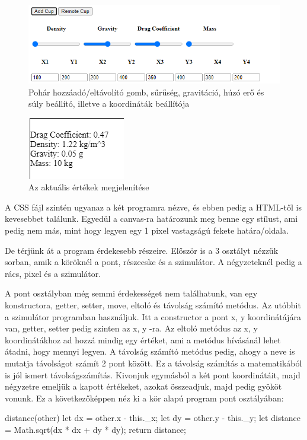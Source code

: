 \begin{figure}[h]
	\centering
	\includegraphics[width=\textwidth]{images/html.png}
	\caption{Pohár hozzáadó/eltávolító gomb, sűrűség, gravitáció, húzó erő és súly beállító, illetve a koordináták beállítója}
	\label{fig:html}
\end{figure}

\begin{figure}[h]
	\centering
	\includegraphics[scale=1]{images/ertekek.png}
	\caption{Az aktuális értékek megjelenítése}
	\label{fig:ertekek}
\end{figure}


A CSS fájl szintén ugyanaz a két programra nézve, és ebben pedig a HTML-től is kevesebbet találunk. Egyedül a canvas-ra határozunk meg benne egy stílust, ami pedig nem más, mint hogy legyen egy 1 pixel vastagságú fekete határa/oldala.


De térjünk át a program érdekesebb részeire. Először is a 3 osztályt nézzük sorban, amik a köröknél a pont, részecske és a szimulátor.
A négyzeteknél pedig a rács, pixel és a szimulátor.


A pont osztályban még semmi érdekességet nem találhatunk, van egy konstructora, getter, setter, move, eltoló és távolság számító metódus. Az utóbbit a szimulátor programban használjuk. Itt a constructor a pont x, y koordinátájára van, getter, setter pedig szinten az x, y -ra. Az eltoló metódus az x, y koordinátákhoz ad hozzá mindig egy értéket, ami a metódus hívásánál lehet átadni, hogy mennyi legyen. A távolság számító metódus pedig, ahogy a neve is mutatja távolságot számít 2 pont között. Ez a távolság számítás a matematikából is jól ismert távolságszámítás. Kivonjuk egymásból a két pont koordinátáit, majd négyzetre emeljük a kapott értékeket, azokat összeadjuk, majd pedig gyököt vonunk. Ez a következőképpen néz ki a kör alapú program pont osztályában:
\begin{java}
distance(other)
  {
    let dx = other.x - this._x;
    let dy = other.y - this._y;
    let distance = Math.sqrt(dx * dx + dy * dy);
    return distance;
  }
\end{java} 

